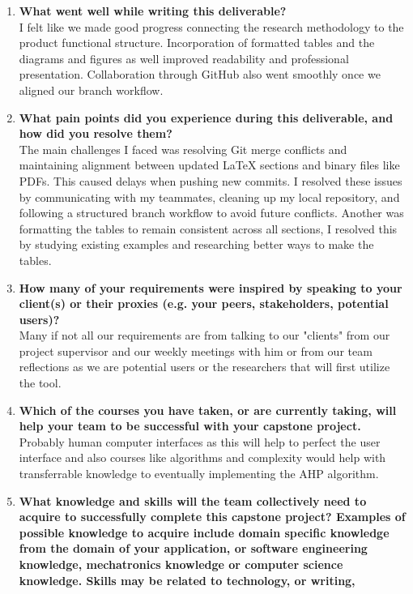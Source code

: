 \begin{enumerate}
  \item \textbf{What went well while writing this deliverable?} \\
  I felt like we made good progress connecting the research methodology to the product functional structure. Incorporation of formatted tables and the diagrams and figures as well improved readability and professional presentation. Collaboration through GitHub also went smoothly once we aligned our branch workflow.
  \item \textbf{What pain points did you experience during this deliverable, and how did
  you resolve them?} \\
  The main challenges I faced was resolving Git merge conflicts and maintaining alignment between updated LaTeX sections and binary files like PDFs. This caused delays when pushing new commits. I resolved these issues by communicating with my teammates, cleaning up my local repository, and following a structured branch workflow to avoid future conflicts. Another was formatting the tables to remain consistent across all sections, I resolved this by studying existing examples and researching better ways to make the tables.
  \item \textbf{How many of your requirements were inspired by speaking to your
  client(s) or their proxies (e.g. your peers, stakeholders, potential users)?} \\
  Many if not all our requirements are from talking to our "clients" from our project supervisor and our weekly meetings with him or from our team reflections as we are potential users or the researchers that will first utilize the tool.
  \item \textbf{Which of the courses you have taken, or are currently taking, will help
  your team to be successful with your capstone project.} \\
  Probably human computer interfaces as this will help to perfect the user interface and also courses like algorithms and complexity would help with transferrable knowledge to eventually implementing the AHP algorithm.
  \item \textbf{What knowledge and skills will the team collectively need to acquire to
  successfully complete this capstone project?  Examples of possible knowledge
  to acquire include domain specific knowledge from the domain of your
  application, or software engineering knowledge, mechatronics knowledge or
  computer science knowledge.  Skills may be related to technology, or writing,
}
\end{enumerate}
